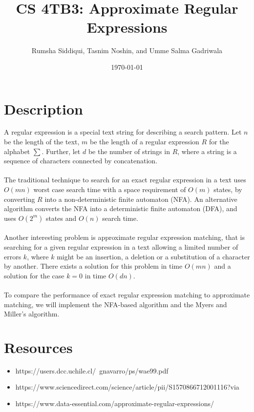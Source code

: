 \documentclass[letterpaper,12pt]{article}
\begin{document}
\title{CS 4TB3: Approximate Regular Expressions}
\author{Rumsha Siddiqui, Tasnim Noshin, and Umme Salma Gadriwala}
\date{\today}
\maketitle



\section{Description}


A regular expression is a special text string for describing a search pattern. Let \(n\) be the length of the text, \(m\) be the length of a regular expression \(R\) for the alphabet \(\sum\). Further, let \(d\) be the number of strings in \(R\), where a string is a sequence of characters connected by concatenation.
\\\\
The traditional technique to search for an exact regular expression in a text uses \(O(mn)\) worst case search time with a space requirement of \(O(m)\) states, by converting \(R\) into a non-deterministic finite automaton (NFA). An alternative algorithm converts the NFA into a deterministic finite automaton (DFA), and uses \(O(2^m)\) states and \(O(n)\) search time.
\\\\
Another interesting problem is approximate regular expression matching, that is searching for a given regular expression in a text allowing a limited number of errors \(k\), where \(k\) might be an insertion, a deletion or a substitution of a character by another. There exists a solution for this problem in time \(O(mn)\) and a solution for the case \(k = 0\) in time \(O(dn)\).
\\\\
To compare the performance of exact regular expression matching to approximate matching, we will implement the NFA-based algorithm and the Myers and Miller's algorithm.

\section{Resources}
\begin{itemize}
\item https://users.dcc.uchile.cl/~gnavarro/ps/wae99.pdf
\item https://www.sciencedirect.com/science/article/pii/S1570866712001116?via%
\item https://www.data-essential.com/approximate-regular-expressions/
\end{itemize}
\end{document}
